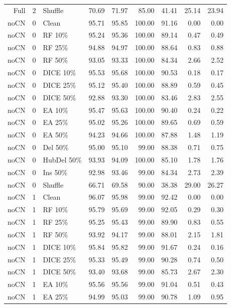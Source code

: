 {\begin{longtable}{rllrrrrrr}
Full & 2 & Shuffle & 70.69 & 71.97 & 85.00 & 41.41 & 25.14 & 23.94 \\
noCN & 0 & Clean & 95.71 & 95.85 & 100.00 & 91.16 & 0.00 & 0.00 \\
noCN & 0 & RF 10\% & 95.24 & 95.36 & 100.00 & 89.14 & 0.47 & 0.49 \\
noCN & 0 & RF 25\% & 94.88 & 94.97 & 100.00 & 88.64 & 0.83 & 0.88 \\
noCN & 0 & RF 50\% & 93.05 & 93.33 & 100.00 & 84.34 & 2.66 & 2.52 \\
noCN & 0 & DICE 10\% & 95.53 & 95.68 & 100.00 & 90.53 & 0.18 & 0.17 \\
noCN & 0 & DICE 25\% & 95.12 & 95.40 & 100.00 & 88.89 & 0.59 & 0.45 \\
noCN & 0 & DICE 50\% & 92.88 & 93.30 & 100.00 & 83.46 & 2.83 & 2.55 \\
noCN & 0 & EA 10\% & 95.47 & 95.63 & 100.00 & 90.40 & 0.24 & 0.22 \\
noCN & 0 & EA 25\% & 95.02 & 95.26 & 100.00 & 89.65 & 0.69 & 0.59 \\
noCN & 0 & EA 50\% & 94.23 & 94.66 & 100.00 & 87.88 & 1.48 & 1.19 \\
noCN & 0 & Del 50\% & 95.00 & 95.10 & 99.00 & 88.38 & 0.71 & 0.75 \\
noCN & 0 & HubDel 50\% & 93.93 & 94.09 & 100.00 & 85.10 & 1.78 & 1.76 \\
noCN & 0 & Ins 50\% & 92.98 & 93.46 & 99.00 & 84.34 & 2.73 & 2.39 \\
noCN & 0 & Shuffle & 66.71 & 69.58 & 90.00 & 38.38 & 29.00 & 26.27 \\
noCN & 1 & Clean & 96.07 & 95.98 & 99.00 & 92.42 & 0.00 & 0.00 \\
noCN & 1 & RF 10\% & 95.79 & 95.69 & 99.00 & 92.05 & 0.29 & 0.30 \\
noCN & 1 & RF 25\% & 95.25 & 95.43 & 99.00 & 89.90 & 0.83 & 0.55 \\
noCN & 1 & RF 50\% & 93.92 & 94.17 & 99.00 & 88.01 & 2.15 & 1.81 \\
noCN & 1 & DICE 10\% & 95.84 & 95.82 & 99.00 & 91.67 & 0.24 & 0.16 \\
noCN & 1 & DICE 25\% & 95.33 & 95.49 & 99.00 & 90.28 & 0.74 & 0.50 \\
noCN & 1 & DICE 50\% & 93.40 & 93.68 & 99.00 & 85.73 & 2.67 & 2.30 \\
noCN & 1 & EA 10\% & 95.56 & 95.56 & 99.00 & 91.04 & 0.51 & 0.43 \\
noCN & 1 & EA 25\% & 94.99 & 95.03 & 99.00 & 90.78 & 1.09 & 0.95 \\

\end{longtable}}
